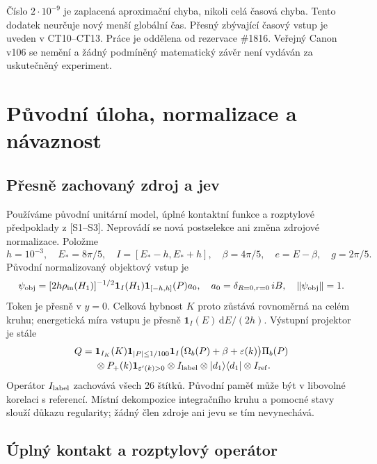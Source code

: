 \documentclass[11pt,a4paper]{article}
\theoremstyle{remark}\newtheorem{remark}[theorem]{Poznámka}
\numberwithin{equation}{section}
\begin{document}
\vfill
\small
Číslo \(2\cdot10^{-9}\) je zaplacená aproximační chyba,
nikoli celá časová chyba. Tento dodatek neurčuje nový menší
globální čas. Přesný zbývající časový vstup je uveden v CT10--CT13.
Práce je oddělena od rezervace \#1816. Veřejný Canon v106 se
nemění a žádný podmíněný matematický závěr není vydáván za
uskutečněný experiment.
\newpage\normalsize
\tableofcontents
\clearpage

\section{Původní úloha, normalizace a návaznost}

\subsection{Přesně zachovaný zdroj a jev}

Používáme původní unitární model, úplné kontaktní funkce
a rozptylové předpoklady z [S1--S3]. Neprovádí se nová
postselekce ani změna zdrojové normalizace. Položme
\[
h=10^{-3},\quad E_*=8\pi/5,\quad I=[E_*-h,E_*+h],
\quad \beta=4\pi/5,\quad e=E-\beta,\quad g=2\pi/5.
\]
Původní normalizovaný objektový vstup je
\[
\psi_{\rm obj}
=[2h\rho_{\rm in}(H_1)]^{-1/2}
\mathbf1_I(H_1)\mathbf1_{[-h,h]}(P)a_0,
\quad a_0=\delta_{R=0,r=0}\,iB,
\quad \|\psi_{\rm obj}\|=1.
\]
Token je přesně v \(y=0\). Celková hybnost \(K\) proto
zůstává rovnoměrná na celém kruhu; energetická míra vstupu
je přesně \(\mathbf1_I(E)\,\mathrm dE/(2h)\).
Výstupní projektor je stále
\[
\begin{aligned}
Q={}&\mathbf1_{I_K}(K)\mathbf1_{|P|\le1/100}
\mathbf1_I\bigl(\Omega_b(P)+\beta+\varepsilon(k)\bigr)\Pi_b(P)\\
&\otimes P_+(k)\mathbf1_{\varepsilon'(k)>0}
\otimes I_{\rm label}\otimes|d_1\rangle\langle d_1|
\otimes I_{\rm ref}.
\end{aligned}
\]
Operátor \(I_{\rm label}\) zachovává všech 26 štítků.
Původní paměť může být v libovolné korelaci s referencí.
Místní dekompozice integračního kruhu a pomocné stavy slouží důkazu
regularity; žádný člen zdroje ani jevu se tím nevynechává.

\subsection{Úplný kontakt a rozptylový operátor}
\end{document}
